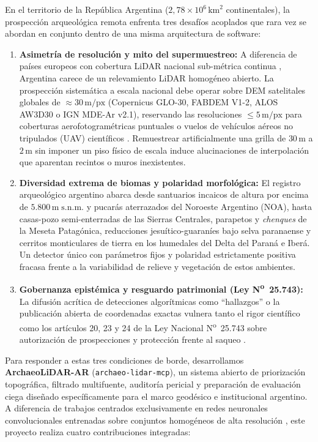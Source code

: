 \documentclass[11pt,a4paper]{article}
\DeclareRobustCommand{\_}{\ifmmode\mbox{\textunderscore}\else\textunderscore\allowbreak\fi}
\begin{document}
En el territorio de la Rep\'ublica Argentina ($2{,}78\times 10^6\,\mathrm{km}^2$ continentales), la prospecci\'on arqueol\'ogica remota enfrenta tres desaf\'ios acoplados que rara vez se abordan en conjunto dentro de una misma arquitectura de software:
\begin{enumerate}
  \item \textbf{Asimetr\'ia de resoluci\'on y mito del supermuestreo:} A diferencia de pa\'ises europeos con cobertura LiDAR nacional sub-m\'etrica continua \citep{Verschoof2019,Trier2021}, Argentina carece de un relevamiento LiDAR homog\'eneo abierto. La prospecci\'on sistem\'atica a escala nacional debe operar sobre DEM satelitales globales de $\approx 30\,\mathrm{m/px}$ (Copernicus GLO-30, FABDEM V1-2, ALOS AW3D30 o IGN MDE-Ar v2.1), reservando las resoluciones $\le 5\,\mathrm{m/px}$ para coberturas aerofotogram\'etricas puntuales o vuelos de veh\'iculos a\'ereos no tripulados (UAV) científicos \citep{Hawker2022,Orengo2020,Soderholm2019}. Remuestrear artificialmente una grilla de $30\,\mathrm{m}$ a $2\,\mathrm{m}$ sin imponer un piso f\'isico de escala induce alucinaciones de interpolaci\'on que aparentan recintos o muros inexistentes.
  \item \textbf{Diversidad extrema de biomas y polaridad morfol\'ogica:} El registro arqueol\'ogico argentino abarca desde santuarios incaicos de altura por encima de $5.800\,\mathrm{m\;s.n.m.}$ \citep{MoyanoDiaz2015} y pucar\'as aterrazados del Noroeste Argentino (NOA), hasta casas-pozo semi-enterradas de las Sierras Centrales, parapetos y \emph{chenques} de la Meseta Patag\'onica, reducciones jesu\'itico-guaran\'ies bajo selva paranaense y cerritos monticulares de tierra en los humedales del Delta del Paran\'a e Iber\'a. Un detector \'unico con par\'ametros fijos y polaridad estrictamente positiva fracasa frente a la variabilidad de relieve y vegetación de estos ambientes.
  \item \textbf{Gobernanza epist\'emica y resguardo patrimonial (Ley N\textsuperscript{o}~25.743):} La difusi\'on acr\'itica de detecciones algor\'itmicas como ``hallazgos'' o la publicaci\'on abierta de coordenadas exactas vulnera tanto el rigor cient\'ifico \citep{Casana2014,Casana2021} como los art\'iculos 20, 23 y 24 de la Ley Nacional N\textsuperscript{o}~25.743 sobre autorizaci\'on de prospecciones y protecci\'on frente al saqueo \citep{Ley25743}.
\end{enumerate}

Para responder a estas tres condiciones de borde, desarrollamos \textbf{ArchaeoLiDAR-AR} (\texttt{archaeo-lidar-mcp}), un sistema abierto de priorizaci\'on topogr\'afica, filtrado multifuente, auditor\'ia pericial y preparaci\'on de evaluaci\'on ciega dise\~nado espec\'ificamente para el marco geod\'esico e institucional argentino. A diferencia de trabajos centrados exclusivamente en redes neuronales convolucionales entrenadas sobre conjuntos homog\'eneos de alta resoluci\'on \citep{Trier2021,BerganzoBesga2021}, este proyecto realiza cuatro contribuciones integradas:
\end{document}
